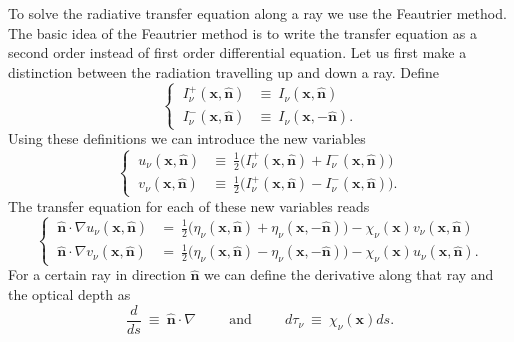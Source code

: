 \documentclass[]{article}
\begin{document}
To solve the radiative transfer equation along a ray we use the Feautrier method. The basic idea of the Feautrier method is to write the transfer equation as a second order instead of first order differential equation. Let us first make a distinction between the radiation travelling up and down a ray. Define
\begin{equation}
\begin{cases}
\ I^{+}_{\nu}(\textbf{x},\hat{\textbf{n}})  &\equiv \ I_{\nu}(\textbf{x},\hat{\textbf{n}}) \\
\ I^{-}_{\nu}(\textbf{x},\hat{\textbf{n}})  &\equiv \ I_{\nu}(\textbf{x},-\hat{\textbf{n}}) .
\end{cases}
\end{equation}
Using these definitions we can introduce the new variables
\begin{equation}
\begin{cases}
\ u_{\nu}(\textbf{x},\hat{\textbf{n}})  &\equiv \ \frac{1}{2}\big( I^{+}_{\nu}(\textbf{x},\hat{\textbf{n}}) + I^{-}_{\nu}(\textbf{x},\hat{\textbf{n}}) \big) \\
\ v_{\nu}(\textbf{x},\hat{\textbf{n}})  &\equiv \ \frac{1}{2}\big( I^{+}_{\nu}(\textbf{x},\hat{\textbf{n}}) - I^{-}_{\nu}(\textbf{x},\hat{\textbf{n}}) \big) .
\end{cases}
\end{equation}
The transfer equation for each of these new variables reads
\begin{equation}
\begin{cases}
\ \hat{\textbf{n}} \cdot \nabla u_{\nu}(\textbf{x},\hat{\textbf{n}}) &= \ \frac{1}{2} \big( \eta_{\nu}(\textbf{x},\hat{\textbf{n}}) + \eta_{\nu}(\textbf{x},-\hat{\textbf{n}}) \big) - \chi_{\nu}(\textbf{x}) v_{\nu}(\textbf{x},\hat{\textbf{n}}) \\
\ \hat{\textbf{n}} \cdot \nabla v_{\nu}(\textbf{x},\hat{\textbf{n}}) &= \ \frac{1}{2} \big( \eta_{\nu}(\textbf{x},\hat{\textbf{n}}) - \eta_{\nu}(\textbf{x},-\hat{\textbf{n}}) \big) - \chi_{\nu}(\textbf{x}) u_{\nu}(\textbf{x},\hat{\textbf{n}}) .
\end{cases}
\end{equation}
For a certain ray in direction $\hat{\textbf{n}}$ we can define the derivative along that ray and the optical depth as
\begin{equation}
\frac{d}{ds} \ \equiv \ \hat{\textbf{n}} \cdot \nabla \hspace{1cm} \text{and} \hspace{1cm} d\tau_{\nu} \ \equiv \ \chi_{\nu}(\textbf{x}) ds.
\end{equation}
\end{document}
